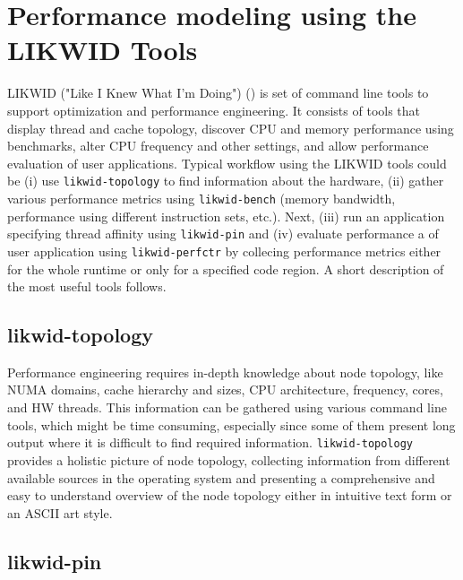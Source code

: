 \section{Performance modeling using the LIKWID Tools}
\label{sec:likwid}

LIKWID ("Like I Knew What I'm Doing") (\cite{likwid-2010-arxiv}) is set of command line tools to support optimization and performance engineering.
It consists of tools that display thread and cache topology, discover CPU and memory performance using benchmarks, alter CPU frequency and other settings, and allow performance evaluation of user applications.
Typical workflow using the LIKWID tools could be (i) use \texttt{likwid-topology} to find information about the hardware, (ii) gather various performance metrics using \texttt{likwid-bench} (memory bandwidth, performance using different instruction sets, etc.). Next, (iii) run an application specifying thread affinity using \texttt{likwid-pin} and (iv) evaluate performance a of user application using \texttt{likwid-perfctr} by collecing performance metrics either for the whole runtime or only for a specified code region.
A short description of the most useful tools follows.

\subsection*{likwid-topology}

Performance engineering requires  in-depth knowledge about node topology, like NUMA domains, cache hierarchy and sizes, CPU architecture, frequency, cores, and HW threads.
This information can be gathered using various command line tools, which might be time consuming, especially since some of them present long output where it is difficult to find required information. \texttt{likwid-topology} provides a holistic picture of node topology, collecting information from different available sources in the operating system and presenting a comprehensive and easy to understand overview of the node topology either in intuitive text form or an ASCII art style.

\subsection*{likwid-pin}

